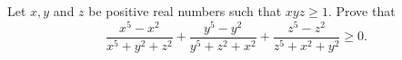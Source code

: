 Let $x, y$ and $z$ be positive real numbers such that $xyz \geq 1$. Prove that
\[ \frac{x^5 - x^2}{x^5 + y^2 + z^2} + \frac{y^5 - y^2}{y^5 + z^2 + x^2} + \frac{z^5 - z^2}{z^5 + x^2 + y^2} \geq 0. \]
